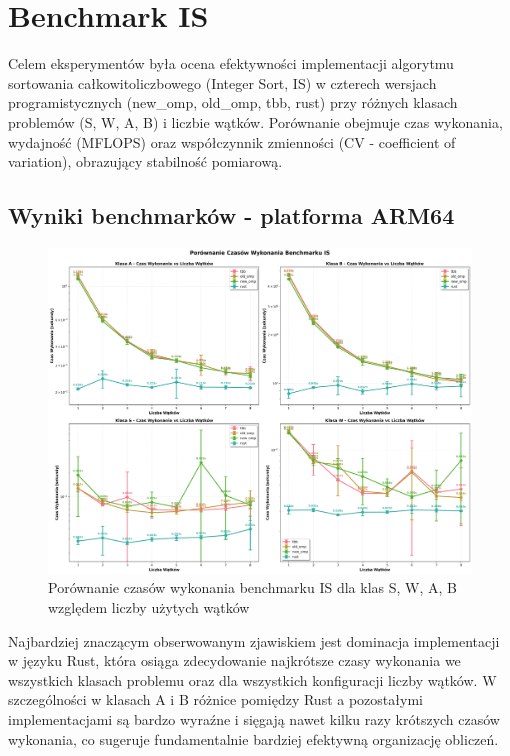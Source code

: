 
\section{Benchmark IS}
Celem eksperymentów była ocena efektywności implementacji algorytmu sortowania całkowitoliczbowego (Integer Sort, IS) w czterech wersjach programistycznych (new\_omp, old\_omp, tbb, rust) przy różnych klasach problemów (S, W, A, B) i liczbie wątków. Porównanie obejmuje czas wykonania, wydajność (MFLOPS) oraz współczynnik zmienności (CV - coefficient of variation), obrazujący stabilność pomiarową.

\subsection{Wyniki benchmarków - platforma ARM64}
\begin{figure}[H]
    \centering
    \includegraphics[width=\textwidth]{analiza/images/parallel/is/arm/is_porownanie_czasow_wykonania.png}
    \caption{Porównanie czasów wykonania benchmarku IS dla klas S, W, A, B względem liczby użytych wątków}
    \label{is_porownanie_czasow_wykonania}
\end{figure}

Najbardziej znaczącym obserwowanym zjawiskiem jest dominacja implementacji w języku Rust, która osiąga zdecydowanie najkrótsze czasy wykonania we wszystkich klasach problemu oraz dla wszystkich konfiguracji liczby wątków. W szczególności w klasach A i B różnice pomiędzy Rust a pozostałymi implementacjami są bardzo wyraźne i sięgają nawet kilku razy krótszych czasów wykonania, co sugeruje fundamentalnie bardziej efektywną organizację obliczeń.

